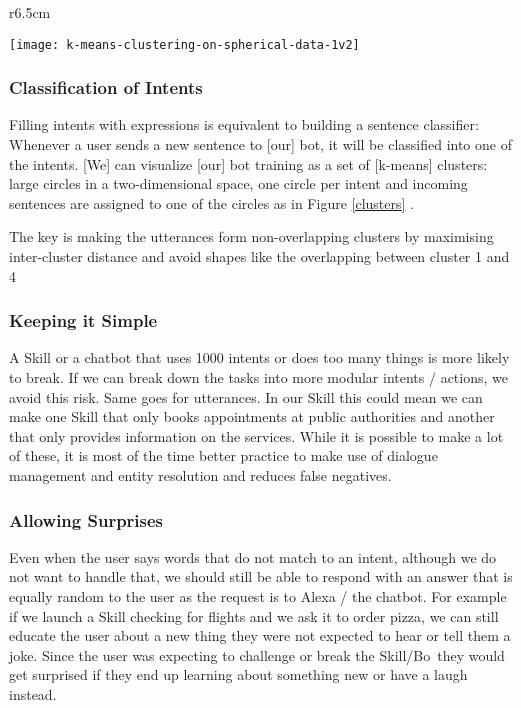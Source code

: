 \hspace*{-\parindent}%
\begin{minipage}[H]{\linewidth}

\begin{wrapfigure}{r}{6.5cm}
	\caption[K-means Clusters Example] {K-means Clusters of Utterances, based on Deschamps \cite{botbestbractis}}
	\label{clusters}
	\centering
	\texttt{[image: k-means-clustering-on-spherical-data-1v2]} 
\end{wrapfigure}




\subsubsection*{Classification of Intents}
Filling intents with expressions is equivalent to building a sentence classifier: Whenever a user sends a new sentence to [our] bot, it will be classified into one of the intents. [We] can visualize [our] bot training as a set of [k-means] clusters: large circles  in a two-dimensional space, one circle per intent and incoming sentences are assigned to one of the circles as in Figure \ref{clusters} \cite{botbestbractis}.

The key is making the utterances form non-overlapping clusters by maximising inter-cluster distance and avoid shapes like the overlapping between cluster 1 and 4

\end{minipage}


\subsubsection*{Keeping it Simple}

A Skill or a chatbot that uses 1000 intents or does too many things is more likely to break. If we can break down the tasks into more modular intents / actions, we avoid this risk. Same goes for utterances. In our Skill this could mean we can make one Skill that only books appointments at public authorities and another that only provides information on the services. While it is possible to make a lot of these, it is most of the time better practice to make use of dialogue management and entity resolution and reduces false negatives.


\subsubsection*{Allowing Surprises}
Even when the user says words that do not match to an intent, although we do not want to handle that, we should still be able to respond with an answer that is equally random to the user as the request is to Alexa / the chatbot. For example if we launch a Skill checking for flights and we ask it to order pizza, we can still educate the user about a new thing they were not expected to hear or tell them a joke. Since the user was expecting to challenge or break the Skill/Bo\, they would get surprised if they end up learning about something new or have a laugh instead.

